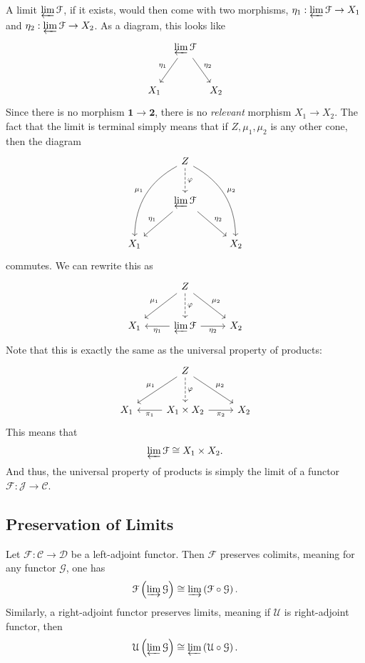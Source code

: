 A limit $\varprojlim \mathcal{F} $, if it exists, would then come with two morphisms, $\eta _1: \varprojlim \mathcal{F}  \to X_1$ and $\eta _2: \varprojlim \mathcal{F}  \to X_2$. As a diagram, this looks like
\[\begin{tikzcd}[row sep = 2.5em, column sep = 0.5em]
 & \varprojlim \mathcal{F} \ar[" \eta _1 "', dl] \ar[" \eta _2 ", dr] & \\
X_1 &  & X_2
\end{tikzcd}\]
Since there is no morphism $\mathbf{1} \to \mathbf{2} $, there is no \emph{relevant} morphism $X_1\to X_2$. The fact that the limit is terminal simply means that if $Z,\mu _1,\mu _2$ is any other cone, then the diagram
\[\begin{tikzcd}[row sep = 2.5em, column sep = 2.5em]
 & Z\ar[dashed, " \varphi  ", d] \ar[bend right, " \mu _1 "', ddl] \ar[bend left, " \mu _2 ", ddr]  &  \\
 & \varprojlim \mathcal{F} \ar[" \eta _1 "', dl] \ar[" \eta _2 ", dr]  &  \\
X_1 &  & X_2
\end{tikzcd}\]
commutes. We can rewrite this as
\[\begin{tikzcd}[row sep = 2.5em, column sep = 2.5em]
 & Z\ar[" \mu _1 "', dl] \ar[" \mu _2 ", dr] \ar[" \varphi  ", dashed, d]  &  \\
X_1 & \varprojlim \mathcal{F} \ar[" \eta _1 ", l] \ar[" \eta _2 "', r]  & X_2
\end{tikzcd}\]
Note that this is exactly the same as the universal property of products:
\[\begin{tikzcd}[row sep =  2.5em, column sep = 2.5em]
 & Z\ar[" \mu _1 "', dl] \ar[" \mu _2 ", dr] \ar[" \varphi  ", dashed, d] &  \\
X_1 & X_1\times X_2\ar[" \pi _1 ", l] \ar[" \pi _2 "', r]  & X_2
\end{tikzcd}\]
This means that
\[
	\varprojlim \mathcal{F} \cong X_1\times X_2
.\]
And thus, the universal property of products is simply the limit of a functor $\mathcal{F} : \mathcal{J}  \to \mathcal{C} $.

\subsection{Preservation of Limits}

\begin{theorem}\label{thm:2}
	Let $\mathcal{F} : \mathcal{C}  \to \mathcal{D} $ be a left-adjoint functor. Then $\mathcal{F} $ preserves colimits, meaning for any functor $\mathcal{G} $, one has
	\[
		\mathcal{F} \left( \varinjlim \mathcal{G}  \right) \cong \varinjlim \left( \mathcal{F} \circ \mathcal{G}  \right) 
	.\]
	Similarly, a right-adjoint functor preserves limits, meaning if $\mathcal{U} $ is right-adjoint functor, then
	\[
		\mathcal{U} \left( \varprojlim \mathcal{G}  \right) \cong \varprojlim \left( \mathcal{U} \circ \mathcal{G}  \right) 
	.\]
\end{theorem}

